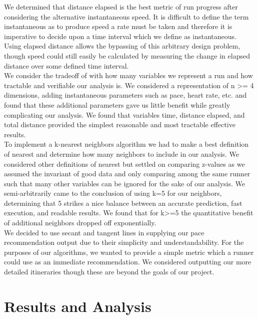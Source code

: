 \documentclass[twoside]{article}
\begin{document}
\begin{multicols}{2}
	We determined that distance elapsed is the best metric of run progress after considering the alternative instantaneous speed.  It is difficult to define the term instantaneous as to produce speed a rate must be taken and therefore it is imperative to decide upon a time interval which we define as instantaneous.  Using elapsed distance allows the bypassing of this arbitrary design problem, though speed could still easily be calculated by measuring the change in elapsed distance over some defined time interval.\\
	
	We consider the tradeoff of with how many variables we represent a run and how tractable and verifiable our analysis is.  We considered a representation of n >= 4 dimensions, adding instantaneous parameters such as pace, heart rate, etc. and found that these additional parameters gave us little benefit while greatly complicating our analysis.  We found that variables time, distance elapsed, and total distance provided the simplest reasonable and most tractable effective results.\\
	
	To implement a k-nearest neighbors algorithm we had to make a best definition of nearest and determine how many neighbors to include in our analysis.  We considered other definitions of nearest but settled on comparing z-values as we assumed the invariant of good data and only comparing among the same runner such that many other variables can be ignored for the sake of our analysis.  We semi-arbitrarily came to the conclusion of using k=5 for our neighbors, determining that 5 strikes a nice balance between an accurate prediction, fast execution, and readable results.  We found that for k>=5 the quantitative benefit of additional neighbors dropped off exponentially.\\
	
	We decided to use secant and tangent lines in supplying our pace recommendation output due to their simplicity and understandability. For the purposes of our algorithms, we wanted to provide a simple metric which a runner could use as an immediate recommendation.  We considered outputting our more detailed itineraries though these are beyond the goals of our project.\\




\section{Results and Analysis}


\end{multicols}
\end{document}
